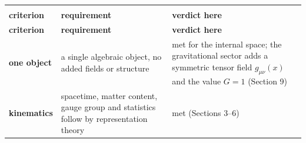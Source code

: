 \documentclass[aps,prd,amsmath,amssymb,superscriptaddress,longbibliography,floatfix,preprint]{revtex4-2}
\begin{document}
{\footnotesize
\renewcommand{\arraystretch}{1.45}

\begin{longtable}{lll}
\multicolumn{3}{l}{} \\
\addlinespace[2pt]
\toprule
\parbox[c]{3.77cm}{\vspace{2.5pt}\raggedright {} \textbf{criterion}\vspace{2.5pt}} & \parbox[c]{4.77cm}{\vspace{2.5pt}\raggedright {} \textbf{requirement}\vspace{2.5pt}} & \parbox[c]{6.55cm}{\vspace{2.5pt}\raggedright {} \textbf{verdict here}\vspace{2.5pt}} \\
\midrule
\endfirsthead
\toprule
\parbox[c]{3.77cm}{\vspace{2.5pt}\raggedright {} \textbf{criterion}\vspace{2.5pt}} & \parbox[c]{4.77cm}{\vspace{2.5pt}\raggedright {} \textbf{requirement}\vspace{2.5pt}} & \parbox[c]{6.55cm}{\vspace{2.5pt}\raggedright {} \textbf{verdict here}\vspace{2.5pt}} \\
\midrule
\endhead
\midrule
\endfoot
\bottomrule
\endlastfoot
\parbox[c]{3.77cm}{\vspace{2.5pt}\raggedright {} \textbf{one object}\vspace{2.5pt}} & \parbox[c]{4.77cm}{\vspace{2.5pt}\raggedright {} a single algebraic object, no added fields or structure\vspace{2.5pt}} & \parbox[c]{6.55cm}{\vspace{2.5pt}\raggedright {} met for the internal space; the gravitational sector adds a symmetric tensor field \mbox{$g_{\mu\nu}(x)$} and the value \mbox{$G = 1$} (Section 9)\vspace{2.5pt}} \\
\hline{}
\parbox[c]{3.77cm}{\vspace{2.5pt}\raggedright {} \textbf{kinematics}\vspace{2.5pt}} & \parbox[c]{4.77cm}{\vspace{2.5pt}\raggedright {} spacetime, matter content, gauge group and statistics follow by representation theory\vspace{2.5pt}} & \parbox[c]{6.55cm}{\vspace{2.5pt}\raggedright {} met (Sections 3--6)\vspace{2.5pt}} \\

\end{longtable}}
\end{document}
